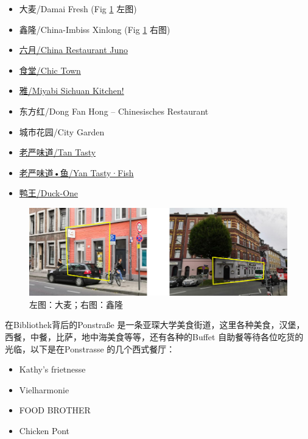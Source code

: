     \begin{itemize}
      \item 大麦/Damai Fresh (Fig \ref{fig:大麦鑫隆} 左图)
      \item 鑫隆/China-Imbiss Xinlong (Fig \ref{fig:大麦鑫隆} 右图)
      \item \href{https://chinarestaurantjuno.eatbu.com/?lang=en}{六月/China Restaurant Juno}
      \item \href{https://chic-town.business.site/}{食堂/Chic Town}
      \item \href{https://miyabi-sichuan-kitchen.business.site/}{雅/Miyabi Sichuan Kitchen!}
      \item 东方红/Dong Fan Hong – Chinesisches Restaurant
      \item 城市花园/City Garden
      \item \href{https://yan-tasty.business.site/}{老严味道/Tan Tasty}
      \item \href{https://www.yantasty-fisch.com/}{老严味道•鱼/Yan Tasty·Fish}
      \item \href{https://duck-one.business.site/}{鸭王/Duck-One}
    \end{itemize}

    \begin{figure}
      \centering
      \includegraphics[width=.8\textwidth]{在亚琛学习和生活/日常消费和饮食/大麦鑫隆.png}
      \caption{左图：大麦；右图：鑫隆}
      \label{fig:大麦鑫隆}
    \end{figure}

    在Bibliothek背后的Ponstraße 是一条亚琛大学美食街道，这里各种美食，汉堡，西餐，中餐，比萨，地中海美食等等，还有各种的Buffet 自助餐等待各位吃货的光临，以下是在Ponstrasse 的几个西式餐厅：

    \begin{itemize}
      \item Kathy's frietnesse
      \item Vielharmonie 
      \item FOOD BROTHER
      \item Chicken Pont
    \end{itemize}

